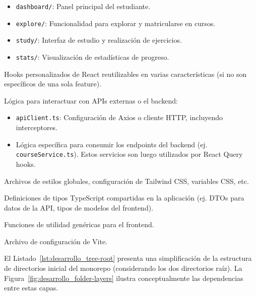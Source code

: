 \begin{description}[leftmargin=*,style=unboxed,font=\normalfont]
\begin{itemize}
        \item \texttt{dashboard/}: Panel principal del estudiante.
        \item \texttt{explore/}: Funcionalidad para explorar y matricularse en cursos.
        \item \texttt{study/}: Interfaz de estudio y realización de ejercicios.
        \item \texttt{stats/}: Visualización de estadísticas de progreso.
    \end{itemize}
  \item[\texttt{src/hooks/}] Hooks personalizados de React reutilizables en varias características (si no son específicos de una sola feature).
  \item[\texttt{src/services/}] Lógica para interactuar con APIs externas o el backend:
    \begin{itemize}
        \item \texttt{apiClient.ts}: Configuración de Axios o cliente HTTP, incluyendo interceptores.
        \item Lógica específica para consumir los endpoints del backend (ej. \texttt{courseService.ts}). Estos servicios son luego utilizados por React Query hooks.
    \end{itemize}
  \item[\texttt{src/styles/}] Archivos de estilos globales, configuración de Tailwind CSS, variables CSS, etc.
  \item[\texttt{src/types/}] Definiciones de tipos TypeScript compartidas en la aplicación (ej. DTOs para datos de la API, tipos de modelos del frontend).
  \item[\texttt{src/utils/}] Funciones de utilidad genéricas para el frontend.
  \item[\texttt{vite.config.ts}] Archivo de configuración de Vite.
\end{description}

El Listado~\ref{lst:desarrollo_tree-root} presenta una simplificación de la estructura de directorios inicial del monorepo (considerando los dos directorios raíz). La Figura~\ref{fig:desarrollo_folder-layers} ilustra conceptualmente las dependencias entre estas capas.

